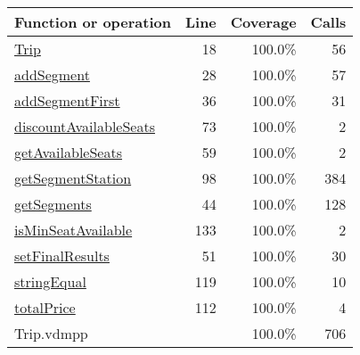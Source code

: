 \bigskip
\begin{longtable}{|l|r|r|r|}
\hline
Function or operation & Line & Coverage & Calls \\
\hline
\hline
\hyperref[Trip:18]{Trip} & 18&100.0\% & 56 \\
\hline
\hyperref[addSegment:28]{addSegment} & 28&100.0\% & 57 \\
\hline
\hyperref[addSegmentFirst:36]{addSegmentFirst} & 36&100.0\% & 31 \\
\hline
\hyperref[discountAvailableSeats:73]{discountAvailableSeats} & 73&100.0\% & 2 \\
\hline
\hyperref[getAvailableSeats:59]{getAvailableSeats} & 59&100.0\% & 2 \\
\hline
\hyperref[getSegmentStation:98]{getSegmentStation} & 98&100.0\% & 384 \\
\hline
\hyperref[getSegments:44]{getSegments} & 44&100.0\% & 128 \\
\hline
\hyperref[isMinSeatAvailable:133]{isMinSeatAvailable} & 133&100.0\% & 2 \\
\hline
\hyperref[setFinalResults:51]{setFinalResults} & 51&100.0\% & 30 \\
\hline
\hyperref[stringEqual:119]{stringEqual} & 119&100.0\% & 10 \\
\hline
\hyperref[totalPrice:112]{totalPrice} & 112&100.0\% & 4 \\
\hline
\hline
Trip.vdmpp & & 100.0\% & 706 \\
\hline
\end{longtable}

